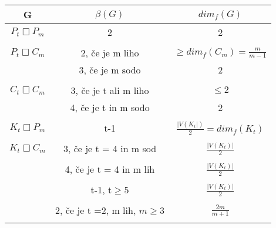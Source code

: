 \documentclass[a4paper]{report}
\begin{document}
	\begin{center}
		\begin{tabular}{ ||c|c|c|| }
			\hline
			G  & $\beta(G)$& $dim_{f}(G)$\\
			\hline
			$P_{t} \Box P_{m} $ & 2& 2 \\
			\hline
			&&\\
			$P_{t} \Box C_{m} $& 2, če je m liho& $ \ge dim_{f}(C_{m})= \frac{m}{m-1}$\\
			& 3, če je m sodo& 2\\
			\hline
			&&\\
			$C_{t} \Box  C_{m}$ & 3, če je t ali m liho& $\le 2 $\\
			&4, če je t in m sodo& 2\\
			\hline
			&&\\
			$K_{t} \Box P_{m}$& t-1 &$\frac{|V(K_{t}|)}{2} = dim_{f}(K_{t})$\\
			\hline
			&&\\
			$K_{t} \Box C_{m}$ & 3, če je t = 4 in m sod& $\frac{|V(K_{t})|}{2}$\\
			&&\\
			&4, če je t = 4 in m lih& $\frac{|V(K_{t})|}{2}$\\
			&&\\
			& t-1, t$\ge$5 &$\frac{|V(K_{t})|}{2}$\\
			&&\\
			&2, če je t =2, m lih, $m\ge 3$ &$\frac{2m}{m+1}$\\
			&&\\
			\hline
	
			\hline
			
		\end{tabular}
	\end{center}
	\newpage
\end{document}
